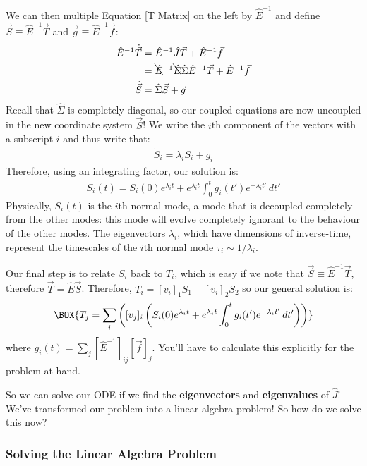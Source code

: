 We can then multiple Equation \ref{T Matrix} on the left by $\hat{E}^{-1}$ and define $\vec{S}\equiv\hat{E}^{-1}\vec{T}$ and $\vec{g}\equiv\hat{E}^{-1}\vec{f}$:
\begin{align*}
    \hat{E}^{-1}\dot{\vec{T}}
    &=
    \hat{E}^{-1}\hat{J}\vec{T}+\hat{E}^{-1}\vec{f}\\
    &=\bcancel{\hat{E}}^{-1}\bcancel{\hat{E}}\hat{\Sigma}\hat{E}^{-1}\vec{T}+\hat{E}^{-1}\vec{f}\\
    \dot{\vec{S}}&=\hat{\Sigma}\vec{S}+\vec{g}
\end{align*}
Recall that $\hat{\Sigma}$ is completely diagonal, so our coupled equations are now uncoupled in the new coordinate system $\vec{S}$! We write the $i$th component of the vectors with a subscript $i$ and thus write that:
\begin{align*}
    \dot{S}_i=\lambda_i S_i + g_i
\end{align*}
Therefore, using an integrating factor, our solution is:
\begin{align*}
    \label{Dym System Gen Sol}
    S_i(t)=S_i(0)e^{\lambda_i t}+e^{\lambda_i t}\int_{0}^{t}g_i(t')e^{-\lambda_i t'}\,dt'
\end{align*}
Physically, $S_i(t)$ is the $i$th normal mode, a mode that is decoupled completely from the other modes: this mode will evolve completely ignorant to the behaviour of the other modes. The eigenvectors $\lambda_i$, which have dimensions of inverse-time, represent the timescales of the $i$th normal mode $\tau_i\sim 1/\lambda_i$.

Our final step is to relate $S_i$ back to $T_i$, which is easy if we note that $\vec{S}\equiv\hat{E}^{-1}\vec{T}$, therefore $\vec{T}=\hat{E}\vec{S}$. Therefore, $T_i=[v_i]_1S_1+[v_i]_2S_2$ so our general solution is:
\begin{align}
    \BOX{
        T_j=\sum_{i} \left( [v_j]_i \left( S_i(0)e^{\lambda_i t}+e^{\lambda_i t}\int_{0}^{t}g_i(t')e^{-\lambda_i t'}\,dt' \right) \right)
    }
\end{align}
where $g_i(t)=\sum_{j}[\hat{E}^{-1}]_{ij}[\vec{f}]_j$. You'll have to calculate this explicitly for the problem at hand.

So we can solve our ODE if we find the \textbf{eigenvectors} and \textbf{eigenvalues} of $\hat{J}$! We've transformed our problem into a linear algebra problem! So how do we solve this now?

\subsubsection{Solving the Linear Algebra Problem}\label{Lin Alg}

